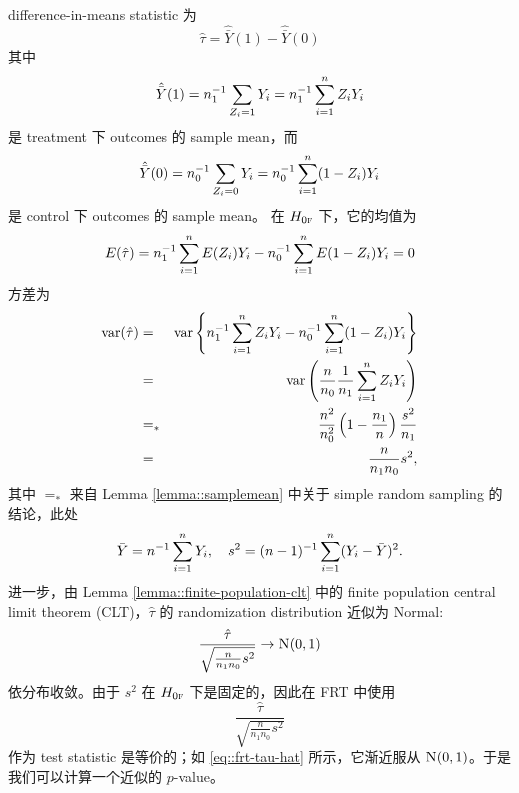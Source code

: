 \begin{example}\label{eq::frt-difference-in-means}
difference-in-means statistic 为
$$
\hat{\tau}   = \hat{\bar{Y}}(1) - \hat{\bar{Y}}(0)
$$
其中
$$
 \hat{\bar{Y}}(1)  =  n_1^{-1} \sum_{Z_i=1} Y_i  = n_1^{-1} \sum_{i=1}^n Z_iY_i 
$$
是 treatment 下 outcomes 的 sample mean，而
$$
\hat{\bar{Y}}(0) = n_0^{-1}  \sum_{Z_i=0} Y_i   = n_0^{-1}  \sum_{i=1}^n (1-Z_i) Y_i 
$$
是 control 下 outcomes 的 sample mean。
%
在 $H_{0\textsc{f}}$ 下，它的均值为
$$
E(  \hat{\tau}    ) = n_1^{-1}\sum_{i=1}^n E(Z_i)Y_i  - n_0^{-1}  \sum_{i=1}^n E(1-Z_i) Y_i  = 0
$$
方差为
\begin{eqnarray*}
\textup{var}( \hat{\tau}   ) &=& \textup{var}\left\{  n_1^{-1} \sum_{i=1}^n Z_iY_i - n_0^{-1}  \sum_{i=1}^n (1-Z_i) Y_i  \right\} \\
&=&\textup{var}\left(  \frac{n}{n_0}    \frac{1}{n_1} \sum_{i=1}^n  Z_i Y_i         \right) \\
&=_*& \frac{n^2}{n_0^2} \left( 1 - \frac{n_1}{n} \right) \frac{s^2}{n_1} \\ 
&=& \frac{n}{n_1 n_0} s^2,
\end{eqnarray*}
其中 $=_*$ 来自 Lemma  \ref{lemma::samplemean} 中关于 simple random sampling 的结论，此处
$$
\bar{Y} = n^{-1}  \sum_{i=1}^n Y_i,\quad 
s^2 = (n-1)^{-1} \sum_{i=1}^n (Y_i - \bar{Y})^2 .  
$$ 
进一步，由 Lemma \ref{lemma::finite-population-clt} 中的 finite population central limit theorem (CLT)，$\hat{\tau}$ 的 randomization distribution 近似为 Normal:
\begin{equation}\label{eq::frt-tau-hat}
\frac{  \hat{\tau}      }{  \sqrt{\frac{n}{n_1 n_0} s^2}    }  
\rightarrow  \N01 
\end{equation}
依分布收敛。由于 $s^2$ 在 $H_{0\textsc{f}}$ 下是固定的，因此在 FRT 中使用
$$
\frac{  \hat{\tau}      }{  \sqrt{\frac{n}{n_1 n_0} s^2}    }  
$$
作为 test statistic 是等价的；如 \eqref{eq::frt-tau-hat} 所示，它渐近服从 $\textsc{N}(0,1)$。于是我们可以计算一个近似的 $p$-value。
\end{example}


